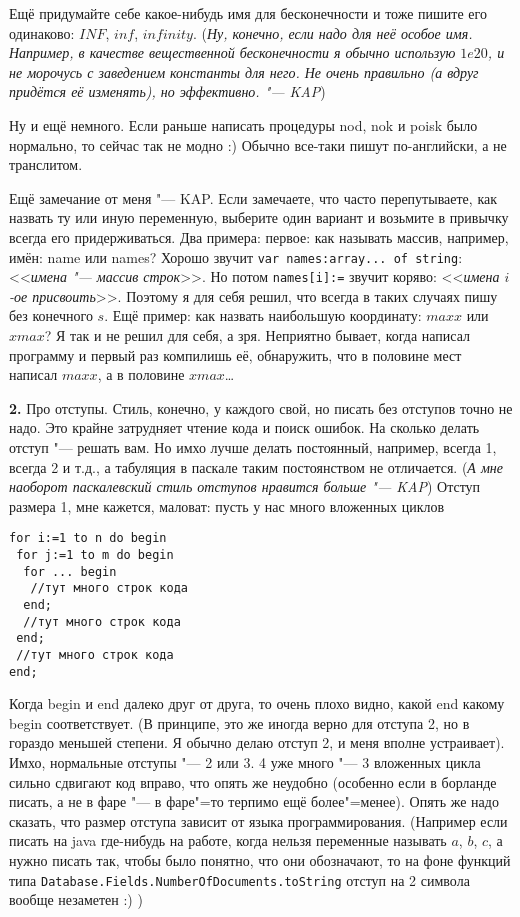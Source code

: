   Ещё придумайте себе какое-нибудь имя для бесконечности и тоже пишите его одинаково: $INF$, $inf$, $infinity$. 
(\textsl{Ну, конечно, если надо для неё особое имя. Например, в качестве вещественной бесконечности 
я обычно использую $1e20$, и не морочусь с заведением константы для него. Не очень правильно (а 
вдруг придётся её изменять), но эффективно. "--- KAP})

  Ну и ещё немного. Если раньше написать процедуры nod, nok и poisk было нормально, то сейчас так не модно :) 
Обычно все-таки пишут по-английски, а не транслитом.

Ещё замечание от меня "--- KAP. Если замечаете, что часто перепутываете, как назвать ту или иную 
переменную, выберите один вариант и возьмите в привычку всегда его придерживаться. Два примера: первое: как 
называть массив, например, имён: name или names? Хорошо звучит \texttt{var names:array... of string}: <<\textit{имена "--- 
массив строк}>>. Но потом \texttt{names[i]:=} звучит коряво: <<\textit{имена $i$-ое присвоить}>>. Поэтому 
я для себя решил, что всегда в таких случаях пишу без конечного $s$. Ещё пример: как назвать 
наибольшую координату: $maxx$ или $xmax$? Я так и не решил для себя, а зря. Неприятно бывает, когда 
написал программу и первый раз компилишь её, обнаружить, что в половине мест написал $maxx$, а в половине 
$xmax$\dots

\textbf{2.} Про отступы. Стиль, конечно, у каждого свой, но писать без отступов точно не надо. Это крайне затрудняет чтение 
кода и поиск ошибок. На сколько делать отступ "--- решать вам. Но имхо лучше делать постоянный, например, всегда 1, 
всегда 2 и т.д., а табуляция в паскале таким постоянством не отличается. (\textsl{А мне наоборот 
паскалевский стиль отступов нравится больше "--- KAP})
Отступ размера 1, мне кажется, маловат: пусть у нас много вложенных циклов
\begin{codesampleo}\begin{verbatim}
for i:=1 to n do begin
 for j:=1 to m do begin
  for ... begin
   //тут много строк кода
  end;
  //тут много строк кода
 end;
 //тут много строк кода
end;    
\end{verbatim}\end{codesampleo}
Когда begin и end далеко друг от друга, то очень плохо видно, какой end какому begin соответствует. (В принципе, 
это же иногда верно для отступа 2, но в гораздо меньшей степени. Я обычно делаю отступ 2, и меня вполне 
устраивает). Имхо, нормальные отступы "--- 2 или 3. 4 уже много "--- 3 вложенных цикла сильно сдвигают код вправо, 
что опять же неудобно (особенно если в борланде писать, а не в фаре "--- в фаре"=то терпимо ещё более"=менее). 
Опять же надо сказать, что размер отступа зависит от языка программирования. (Например если писать на java 
где-нибудь на работе, когда нельзя переменные называть $a$, $b$, $c$, а нужно писать так, чтобы было понятно, что они 
обозначают, то на фоне функций типа \texttt{Database.Fields.NumberOfDocuments.toString} отступ на 2 символа вообще 
незаметен :) )

